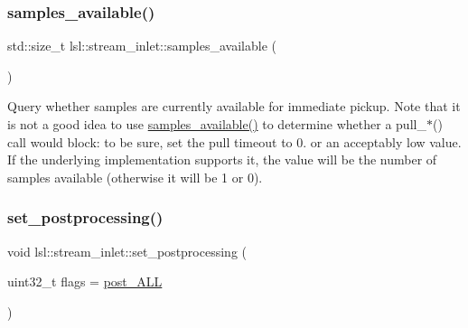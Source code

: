 \subsubsection{\texorpdfstring{samples\+\_\+available()}{samples\_available()}}
{\footnotesize\ttfamily std\+::size\+\_\+t lsl\+::stream\+\_\+inlet\+::samples\+\_\+available (\begin{DoxyParamCaption}{ }\end{DoxyParamCaption})\hspace{0.3cm}{\ttfamily [inline]}}

Query whether samples are currently available for immediate pickup. Note that it is not a good idea to use \hyperlink{classlsl_1_1stream__inlet_a8a4f5ff87d40a696ab4a5d74c03cd52b}{samples\+\_\+available()} to determine whether a pull\+\_\+$\ast$() call would block\+: to be sure, set the pull timeout to 0. or an acceptably low value. If the underlying implementation supports it, the value will be the number of samples available (otherwise it will be 1 or 0). \mbox{\label{classlsl_1_1stream__inlet_aaf40ba9c127a1828933613d0f2b0fc3d}} 
\subsubsection{\texorpdfstring{set\+\_\+postprocessing()}{set\_postprocessing()}}
{\footnotesize\ttfamily void lsl\+::stream\+\_\+inlet\+::set\+\_\+postprocessing (\begin{DoxyParamCaption}\item[{uint32\+\_\+t}]{flags = {\ttfamily \hyperlink{namespacelsl_aaa1cffa7d29bb2756522bc2bb069e310a198f16659e71b850e4674ed31d10e914}{post\+\_\+\+A\+LL}} }\end{DoxyParamCaption})\hspace{0.3cm}{\ttfamily [inline]}}

